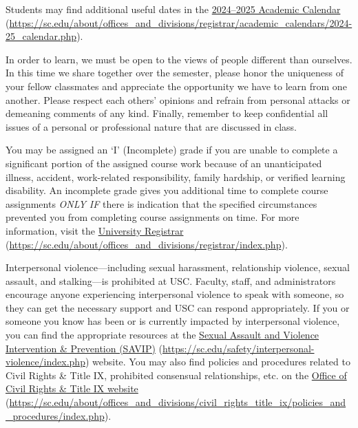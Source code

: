 \documentclass[11pt,letterpaper]{article}
\begin{document}
Students may find additional useful dates in the \href{https://sc.edu/about/offices\_and\_divisions/registrar/academic\_calendars/2024-25\_calendar.php}{2024--2025 Academic Calendar} (\url{https://sc.edu/about/offices\_and\_divisions/registrar/academic\_calendars/2024-25\_calendar.php}). \sectionbreak




In order to learn, we must be open to the views of people different than ourselves. In this time we share together over the semester, please honor the uniqueness of your fellow classmates and appreciate the opportunity we have to learn from one another. Please respect each others' opinions and refrain from personal attacks or demeaning comments of any kind. Finally, remember to keep confidential all issues of a personal or professional nature that are discussed in class. \sectionbreak




You may be assigned an `I' (Incomplete) grade if you are unable to complete a significant portion of the assigned course work because of an unanticipated illness, accident, work-related responsibility, family hardship, or verified learning disability. An incomplete grade gives you additional time to complete course assignments {\itshape ONLY IF} there is indication that the specified circumstances prevented you from completing course assignments on time. For more information, visit the \href{https://sc.edu/about/offices\_and\_divisions/registrar/index.php}{University Registrar} (\url{https://sc.edu/about/offices\_and\_divisions/registrar/index.php}). \sectionbreak




Interpersonal violence---including sexual harassment, relationship violence, sexual assault, and stalking---is prohibited at USC. Faculty, staff, and administrators encourage anyone experiencing interpersonal violence to speak with someone, so they can get the necessary support and USC can respond appropriately. If you or someone you know has been or is currently impacted by interpersonal violence, you can find the appropriate resources at the \href{https://sc.edu/safety/interpersonal-violence/index.php}{Sexual Assault and Violence Intervention \& Prevention (SAVIP)} (\url{https://sc.edu/safety/interpersonal-violence/index.php}) website. You may also find policies and procedures related to Civil Rights \& Title IX, prohibited consensual relationships, etc. on the \href{https://sc.edu/about/offices\_and\_divisions/civil\_rights\_title\_ix/policies\_and\_procedures/index.php}{Office of Civil Rights \& Title IX website} (\url{https://sc.edu/about/offices\_and\_divisions/civil\_rights\_title\_ix/policies\_and\_procedures/index.php}). \pspace
\end{document}

